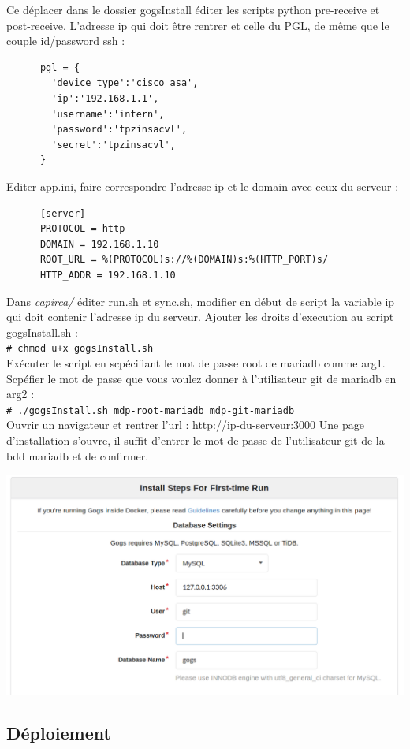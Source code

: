 \documentclass{article}
\newcommand{\shellcmd}[1]{\\\indent\indent\texttt{\footnotesize\# #1}\\}
\begin{document}
      \noindent Ce déplacer dans le dossier gogsInstall éditer les scripts python pre-receive et post-receive.
      L'adresse ip qui doit être rentrer et celle du PGL, de même que le couple id/password ssh :
\begin{verbatim}
      pgl = {
        'device_type':'cisco_asa',
        'ip':'192.168.1.1',
        'username':'intern',
        'password':'tpzinsacvl',
        'secret':'tpzinsacvl',
      }
\end{verbatim}
      Editer app.ini, faire correspondre l'adresse ip et le domain avec ceux du serveur :
\begin{verbatim}
      [server]
      PROTOCOL = http
      DOMAIN = 192.168.1.10
      ROOT_URL = %(PROTOCOL)s://%(DOMAIN)s:%(HTTP_PORT)s/
      HTTP_ADDR = 192.168.1.10
\end{verbatim}
      Dans \textit{capirca/} éditer run.sh et sync.sh, modifier en début de script la variable ip qui doit contenir l'adresse ip du serveur.
      Ajouter les droits d'execution au script gogsInstall.sh : \shellcmd{chmod u+x gogsInstall.sh}
      Exécuter le script en scpécifiant le mot de passe root de mariadb comme arg1. Scpéfier le mot de passe que vous voulez donner
      à l'utilisateur git de mariadb en arg2 : \shellcmd{./gogsInstall.sh mdp-root-mariadb mdp-git-mariadb}
      Ouvrir un navigateur et rentrer l'url : \url{http://ip-du-serveur:3000} \smallbreak
      \noindent Une page d'installation s'ouvre, il suffit d'entrer le mot de passe de l'utilisateur git de la bdd mariadb et de confirmer.
\begin{center}
      \includegraphics[scale=0.2]{first-time-run.png}\smallbreak
\end{center}

    \subsection{Déploiement}
\end{document}
